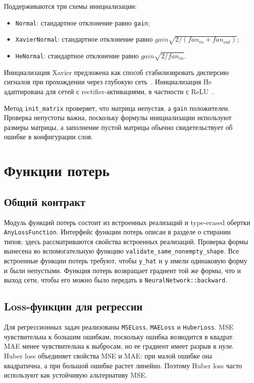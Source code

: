\documentclass{article}
\begin{document}
Поддерживаются три схемы инициализации:
\begin{itemize}
    \item \texttt{Normal}: стандартное отклонение равно \texttt{gain};
    \item \texttt{XavierNormal}: стандартное отклонение равно
        $gain\sqrt{2/(fan_{in}+fan_{out})}$;
    \item \texttt{HeNormal}: стандартное отклонение равно
        $gain\sqrt{2/fan_{in}}$.
\end{itemize}
Инициализация Xavier предложена как способ стабилизировать дисперсию
сигналов при прохождении через глубокую
сеть~\cite{glorot2010understanding}. Инициализация He адаптирована для
сетей с rectifier-активациями, в частности с
ReLU~\cite{he2015delving}.

Метод \texttt{init\_matrix} проверяет, что матрица непустая, а
\texttt{gain} положителен. Проверка непустоты важна, поскольку формулы
инициализации используют размеры матрицы, а заполнение пустой матрицы
обычно свидетельствует об ошибке в конфигурации слоя.

\section{Функции потерь}

\subsection{Общий контракт}

Модуль функций потерь состоит из встроенных реализаций и type-erased
обертки \texttt{AnyLossFunction}. Интерфейс функции потерь описан в
разделе о стирании типов; здесь рассматриваются свойства встроенных
реализаций. Проверка формы вынесена во вспомогательную функцию
\texttt{validate\_same\_nonempty\_shape}. Все встроенные функции
потерь требуют, чтобы \texttt{y\_hat} и \texttt{y} имели одинаковую
форму и были непустыми. Функция потерь возвращает градиент той же
формы, что и выход сети, чтобы его можно было передать в
\texttt{NeuralNetwork::backward}.

\subsection{Loss-функции для регрессии}

Для регрессионных задач реализованы \texttt{MSELoss}, \texttt{MAELoss}
и \texttt{HuberLoss}. MSE чувствительна к большим ошибкам, поскольку
ошибка возводится в квадрат. MAE менее чувствительна к выбросам, но ее
градиент имеет разрыв в нуле. Huber loss объединяет свойства MSE и
MAE: при малой ошибке она квадратична, а при большой ошибке растет
линейно. Поэтому Huber loss часто используют как устойчивую
альтернативу MSE.
\end{document}
